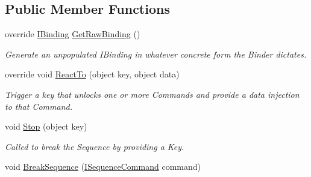 \subsection*{Public Member Functions}
\begin{DoxyCompactItemize}
\item 
\hypertarget{classstrange_1_1extensions_1_1sequencer_1_1impl_1_1_sequencer_aca52e58b596ec7ab2e3d6fe7169c8882}{override \hyperlink{interfacestrange_1_1framework_1_1api_1_1_i_binding}{I\-Binding} \hyperlink{classstrange_1_1extensions_1_1sequencer_1_1impl_1_1_sequencer_aca52e58b596ec7ab2e3d6fe7169c8882}{Get\-Raw\-Binding} ()}\label{classstrange_1_1extensions_1_1sequencer_1_1impl_1_1_sequencer_aca52e58b596ec7ab2e3d6fe7169c8882}

\begin{DoxyCompactList}\small\item\em Generate an unpopulated I\-Binding in whatever concrete form the Binder dictates. \end{DoxyCompactList}\item 
\hypertarget{classstrange_1_1extensions_1_1sequencer_1_1impl_1_1_sequencer_a8aae14bdce3753a0e4b9e890654a6efd}{override void \hyperlink{classstrange_1_1extensions_1_1sequencer_1_1impl_1_1_sequencer_a8aae14bdce3753a0e4b9e890654a6efd}{React\-To} (object key, object data)}\label{classstrange_1_1extensions_1_1sequencer_1_1impl_1_1_sequencer_a8aae14bdce3753a0e4b9e890654a6efd}

\begin{DoxyCompactList}\small\item\em Trigger a key that unlocks one or more Commands and provide a data injection to that Command. \end{DoxyCompactList}\item 
\hypertarget{classstrange_1_1extensions_1_1sequencer_1_1impl_1_1_sequencer_a46c60f178dfb092d8987aa0d2a984598}{void \hyperlink{classstrange_1_1extensions_1_1sequencer_1_1impl_1_1_sequencer_a46c60f178dfb092d8987aa0d2a984598}{Stop} (object key)}\label{classstrange_1_1extensions_1_1sequencer_1_1impl_1_1_sequencer_a46c60f178dfb092d8987aa0d2a984598}

\begin{DoxyCompactList}\small\item\em Called to break the Sequence by providing a Key. \end{DoxyCompactList}\item 
\hypertarget{classstrange_1_1extensions_1_1sequencer_1_1impl_1_1_sequencer_a3385c0c9de68e589eb70c7a617842498}{void \hyperlink{classstrange_1_1extensions_1_1sequencer_1_1impl_1_1_sequencer_a3385c0c9de68e589eb70c7a617842498}{Break\-Sequence} (\hyperlink{interfacestrange_1_1extensions_1_1sequencer_1_1api_1_1_i_sequence_command}{I\-Sequence\-Command} command)}\label{classstrange_1_1extensions_1_1sequencer_1_1impl_1_1_sequencer_a3385c0c9de68e589eb70c7a617842498}


\end{DoxyCompactItemize}
